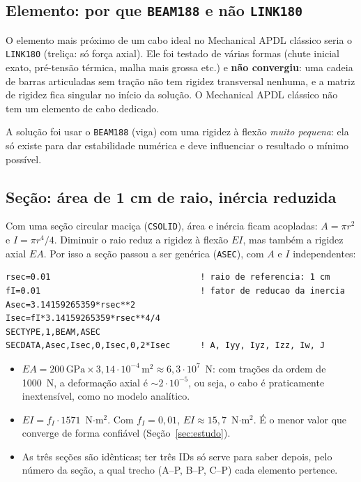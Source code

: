 \documentclass[11pt,a4paper]{article}
\begin{document}
\subsection{Elemento: por que \texttt{BEAM188} e não \texttt{LINK180}}
O elemento mais próximo de um cabo ideal no Mechanical APDL clássico seria o \texttt{LINK180}
(treliça: só força axial). Ele foi testado de várias formas (chute inicial exato, pré-tensão
térmica, malha mais grossa etc.) e \textbf{não convergiu}: uma cadeia de barras articuladas sem
tração não tem rigidez transversal nenhuma, e a matriz de rigidez fica singular no início da solução.
O Mechanical APDL clássico não tem um elemento de cabo dedicado.

A solução foi usar o \texttt{BEAM188} (viga) com uma rigidez à flexão \emph{muito pequena}: ela só
existe para dar estabilidade numérica e deve influenciar o resultado o mínimo possível.

\subsection{Seção: área de 1 cm de raio, inércia reduzida}
Com uma seção circular maciça (\texttt{CSOLID}), área e inércia ficam acopladas: $A=\pi r^2$ e
$I=\pi r^4/4$. Diminuir o raio reduz a rigidez à flexão $EI$, mas também a rigidez axial $EA$.
Por isso a seção passou a ser genérica (\texttt{ASEC}), com $A$ e $I$ independentes:
\begin{lstlisting}[language=APDL]
rsec=0.01                              ! raio de referencia: 1 cm
fI=0.01                                ! fator de reducao da inercia
Asec=3.14159265359*rsec**2
Isec=fI*3.14159265359*rsec**4/4
SECTYPE,1,BEAM,ASEC
SECDATA,Asec,Isec,0,Isec,0,2*Isec      ! A, Iyy, Iyz, Izz, Iw, J
\end{lstlisting}
\begin{itemize}[itemsep=2pt]
  \item $EA = 200\,\text{GPa}\times 3{,}14\cdot10^{-4}\,\text{m}^2 \approx 6{,}3\cdot10^{7}$~N: com
        trações da ordem de 1000~N, a deformação axial é $\sim 2\cdot10^{-5}$, ou seja, o cabo é
        praticamente inextensível, como no modelo analítico.
  \item $EI = f_I\cdot 1571$~N$\cdot$m$^2$. Com $f_I=0{,}01$, $EI \approx 15{,}7$~N$\cdot$m$^2$.
        É o menor valor que converge de forma confiável (Seção~\ref{sec:estudo}).
  \item As três seções são idênticas; ter três IDs só serve para saber depois, pelo número da seção,
        a qual trecho (A--P, B--P, C--P) cada elemento pertence.
\end{itemize}
\end{document}
